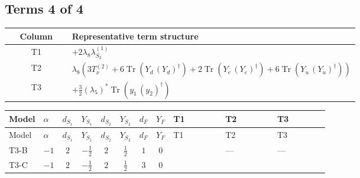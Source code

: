 \documentclass[8pt]{article}
\begin{document}
\begin{landscape}
\subsection*{Terms 4 of 4}
\begin{center}
\begin{tabular}{@{}c >{\raggedright\arraybackslash}p{0.82\linewidth}@{}}
\toprule
Column & Representative term structure \\
\midrule
T1 & \(\displaystyle +2 {\lambda_{8}} {\lambda_{S_2}^{(1)}}\) \\
\midrule
T2 & \(\displaystyle {\lambda_{8}} (3 T_{\nu}^{(2)}+6 \operatorname{Tr}\!\left({Y_d}\,\left({Y_d}\right)^{\dagger}\right)+2 \operatorname{Tr}\!\left({Y_e}\,\left({Y_e}\right)^{\dagger}\right)+6 \operatorname{Tr}\!\left({Y_u}\,\left({Y_u}\right)^{\dagger}\right))\) \\
\midrule
T3 & \(\displaystyle +\frac{3}{2} \left({\lambda_5}\right)^{*} \operatorname{Tr}\!\left({y_1}\,\left({y_2}\right)^{\dagger}\right)\) \\
\midrule
\bottomrule
\end{tabular}
\end{center}
\smallskip
\tiny
\begin{longtable}{@{}llcccccc >{\raggedright\arraybackslash}p{0.21\linewidth} >{\raggedright\arraybackslash}p{0.21\linewidth} >{\raggedright\arraybackslash}p{0.21\linewidth}@{}}
\toprule
Model & $\alpha$ & $d_{S_1}$ & $Y_{S_1}$ & $d_{S_2}$ & $Y_{S_2}$ & $d_F$ & $Y_F$ & T1 & T2 & T3 \\
\midrule
\endfirsthead
\toprule
Model & $\alpha$ & $d_{S_1}$ & $Y_{S_1}$ & $d_{S_2}$ & $Y_{S_2}$ & $d_F$ & $Y_F$ & T1 & T2 & T3 \\
\midrule
\endhead
T3-B & $-1$ & $2$ & $-\frac{1}{2}$ & $2$ & $\frac{1}{2}$ & $1$ & $0$ & \scriptsize\adjustbox{max width=\linewidth}{$\begin{gathered} +2 {\lambda_{8}} {\lambda_{S_2}^{(1)}}\end{gathered}$} & --- & --- \\
\midrule
T3-C & $-1$ & $2$ & $-\frac{1}{2}$ & $2$ & $\frac{1}{2}$ & $3$ & $0$ & \scriptsize\adjustbox{max width=\linewidth}{$\begin{gathered} +2 {\lambda_{8}} {\lambda_{S_2}^{(1)}}\end{gathered}$} & \scriptsize\adjustbox{max width=\linewidth}{$\begin{gathered} {\lambda_{8}} (3 T_{\nu}^{(2)}+6 \operatorname{Tr}\!\left({Y_d}\,\left({Y_d}\right)^{\dagger}\right)+2 \operatorname{Tr}\!\left({Y_e}\,\left({Y_e}\right)^{\dagger}\right)+6 \operatorname{Tr}\!\left({Y_u}\,\left({Y_u}\right)^{\dagger}\right))\end{gathered}$} & \scriptsize\adjustbox{max width=\linewidth}{$\begin{gathered} +\frac{3}{2} \left({\lambda_5}\right)^{*} \operatorname{Tr}\!\left({y_1}\,\left({y_2}\right)^{\dagger}\right)\end{gathered}$} \\

\end{longtable}
\end{landscape}
\end{document}

